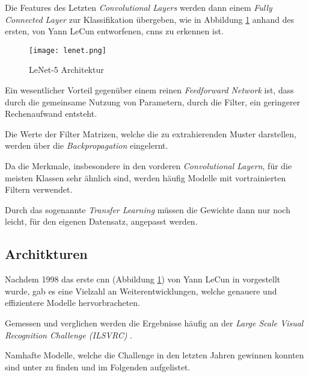 Die Features des Letzten \textit{Convolutional Layers}
 werden dann einem 
\textit{Fully Connected Layer}  zur Klassifikation 
übergeben, wie in Abbildung \ref{fig:lenet} anhand des 
ersten, von Yann LeCun entworfenen, \Glspl{cnn} zu erkennen ist.
\vspace{1cm}

\begin{figure}[H]
    \centering
    \texttt{[image: lenet.png]}
    \caption{LeNet-5 Architektur
    \cite{lecunGradientBasedLearningApplied1998}}
    \label{fig:lenet}
\end{figure}
\vspace{1cm}

Ein wesentlicher Vorteil gegenüber einem reinen 
\textit{Feedforward Network} ist, dass 
durch die gemeinsame Nutzung von Parametern, 
durch die Filter, ein geringerer Rechenaufwand entsteht.

Die Werte der Filter Matrizen, welche die zu 
extrahierenden Muster darstellen, 
werden über die \textit{Backpropagation} eingelernt.

Da die Merkmale, insbesondere in den vorderen 
\textit{Convolutional Layern}, für die meisten 
Klassen sehr ähnlich sind,
werden häufig Modelle mit vortrainierten Filtern 
verwendet.

Durch das sogenannte \textit{Transfer Learning}
müssen die Gewichte dann nur noch leicht, 
für den eigenen Datensatz, angepasst werden.



\subsection{Architkturen}\label{subsubsec:architectures}

Nachdem 1998 das erste \Gls{cnn} (Abbildung \ref{fig:lenet})
 von Yann LeCun in 
\cite{lecunGradientBasedLearningApplied1998} 
vorgestellt wurde, gab es eine Vielzahl 
an Weiterentwicklungen, welche genauere und 
effizientere Modelle hervorbracheten.

Gemessen und verglichen werden die Ergebnisse häufig an 
der \textit{Large Scale Visual Recognition Challenge (ILSVRC)}
\cite{ImageNetLargeScale}.
 
Namhafte Modelle, welche die Challenge in den letzten 
Jahren gewinnen konnten sind unter \cite{stanfordConvNetList}
zu finden und im Folgenden aufgelistet.

